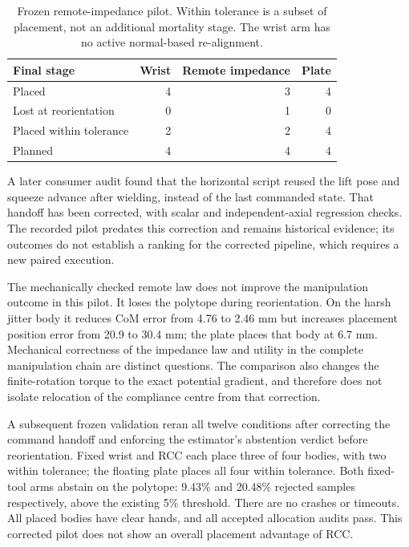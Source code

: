 \begin{table}[htbp]\centering\small
\begin{tabular}{@{}lrrr@{}}\toprule
Final stage & Wrist & Remote impedance & Plate\\\midrule
Placed & 4 & 3 & 4\\
Lost at reorientation & 0 & 1 & 0\\
Placed within tolerance & 2 & 2 & 4\\
Planned & 4 & 4 & 4\\\bottomrule
\end{tabular}
\caption{Frozen remote-impedance pilot. Within tolerance is a subset of placement, not an additional mortality stage. The wrist arm has no active normal-based re-alignment.}
\label{tab:rcc-pilot}
\end{table}

A later consumer audit found that the horizontal script reused the lift pose and squeeze advance after wielding, instead of the last commanded state. That handoff has been corrected, with scalar and independent-axial regression checks. The recorded pilot predates this correction and remains historical evidence; its outcomes do not establish a ranking for the corrected pipeline, which requires a new paired execution.

The mechanically checked remote law does not improve the manipulation outcome in this pilot. It loses the polytope during reorientation. On the harsh jitter body it reduces CoM error from 4.76 to 2.46 mm but increases placement position error from 20.9 to 30.4 mm; the plate places that body at 6.7 mm. Mechanical correctness of the impedance law and utility in the complete manipulation chain are distinct questions. The comparison also changes the finite-rotation torque to the exact potential gradient, and therefore does not isolate relocation of the compliance centre from that correction.

A subsequent frozen validation reran all twelve conditions after correcting the command handoff and enforcing the estimator's abstention verdict before reorientation. Fixed wrist and RCC each place three of four bodies, with two within tolerance; the floating plate places all four within tolerance. Both fixed-tool arms abstain on the polytope: 9.43\% and 20.48\% rejected samples respectively, above the existing 5\% threshold. There are no crashes or timeouts. All placed bodies have clear hands, and all accepted allocation audits pass. This corrected pilot does not show an overall placement advantage of RCC.


